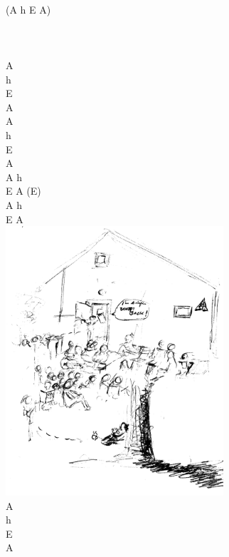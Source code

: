 \documentclass[a5paper, 10pt]{book}
\begin{document}
\begin{minipage}[t]{0.2\textwidth}
  ~\\
(A h E A)\\~\\~\\~\\
A\\
h\\
E\\
A\\

A\\
h\\
E\\
A\\

A h\\
E A (E)\\
A h\\
E A\\

\includegraphics[height=10cm, right]{images/all_about_that_bass_2.png}\vspace*{-10cm}\\
A\\
h\\
E\\
A\\
\end{minipage}

\newpage
\end{document}
